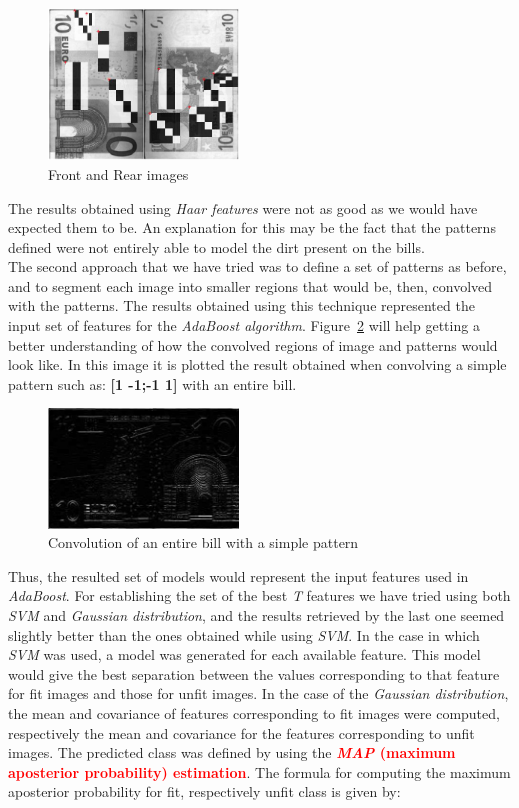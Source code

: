 \documentclass[11pt,twocolumn]{article}
\newcommand{\todo}[1]{\textcolor{red}{\textbf{#1}}}
\begin{document}
\begin{figure}[!hbtp]
\centering
\includegraphics[width=0.45\textwidth]{img/haar.jpg}
\caption{Front and Rear images}
\label{Haar_features}
\end{figure}
	\hspace*{10px}The results obtained using \emph{Haar features} were not as good as we would have expected them to be. An explanation for this may be the fact that the patterns defined were not entirely able to model the dirt present on the bills.\\
	\hspace*{10px}The second approach that we have tried was to define a set of patterns as before, and to segment each image into smaller regions that would be, then, convolved with the patterns. The results obtained using this technique represented the input set of features for the \emph{AdaBoost algorithm}. Figure~\ref{convolved} will help getting a better understanding of how the convolved regions of image and patterns would look like. In this image it is plotted the result obtained when convolving a simple pattern such as: \textbf{[1 -1;-1 1]} with an entire bill.\\
\begin{figure}[!hbtp]
\centering
\includegraphics[width=0.45\textwidth]{img/convolution.jpg}
\caption{Convolution of an entire bill with a simple pattern}
\label{convolved}
\end{figure} 
Thus, the resulted set of models would represent the input features used in \emph{AdaBoost}. For establishing the set of the best \emph{T} features we have tried using both \emph{SVM} and \emph{Gaussian distribution}, and the results retrieved by the last one seemed slightly better than the ones obtained while using \emph{SVM}. In the case in which \emph{SVM} was used, a model was generated for each available feature. This model would give the best separation between the values corresponding to that feature for fit images and those for unfit images. In the case of the \emph{Gaussian distribution}, the mean and covariance of features corresponding to fit images were computed, respectively the mean and covariance for the features corresponding to unfit images. The predicted class was defined by using the \todo{\emph{MAP} (maximum aposterior probability) estimation}. The formula for computing the maximum aposterior probability for fit, respectively unfit class is given by:
\end{document}
